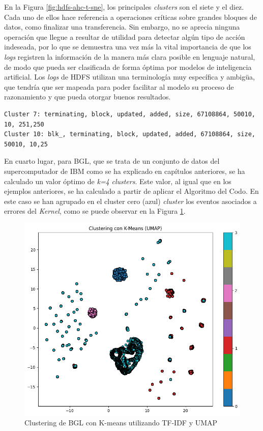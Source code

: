 En la Figura \ref{fig:hdfs-ahc-t-sne}, los principales \textit{clusters} son el siete y el diez. Cada uno de ellos hace referencia a operaciones críticas sobre grandes bloques de datos, como finalizar una transferencia. Sin embargo, no se aprecia ninguna operación que llegue a resultar de utilidad para detectar algún tipo de acción indeseada, por lo que se demuestra una vez más la vital importancia de que los \textit{logs} registren la información de la manera más clara posible en lenguaje natural, de modo que pueda ser clasificada de forma óptima por modelos de inteligencia artificial. Los \textit{logs} de \gls{HDFS} utilizan una terminología muy específica y ambigüa, que tendría que ser mapeada para poder facilitar al modelo su proceso de razonamiento y que pueda otorgar buenos resultados.

\begin{mdframed}
\scriptsize
\begin{verbatim}
Cluster 7: terminating, block, updated, added, size, 67108864, 50010, 10, 251,250
Cluster 10: blk_, terminating, block, updated, added, 67108864, size, 50010, 10,25
\end{verbatim}
\end{mdframed}

En cuarto lugar, para \gls{BGL}, que se trata de un conjunto de datos del supercomputador de \gls{IBM} como se ha explicado en capítulos anteriores, se ha calculado un valor óptimo de \textit{k=4} \textit{clusters}. Este valor, al igual que en los ejemplos anteriores, se ha calculado a partir de aplicar el Algoritmo del Codo. En este caso se han agrupado en el cluster cero (azul) \textit{cluster} los eventos asociados a errores del \textit{Kernel}, como se puede observar en la Figura \ref{fig:dataset_04_umap}. 

\begin{figure}[H]
    \centering
    \includegraphics[width=0.6\linewidth]{imagenes/dataset_04_k-means-umap.png}
    \caption{Clustering de \gls{BGL} con K-means utilizando \gls{TF}-\gls{IDF} y \gls{UMAP}}
    \label{fig:dataset_04_umap}
\end{figure}

